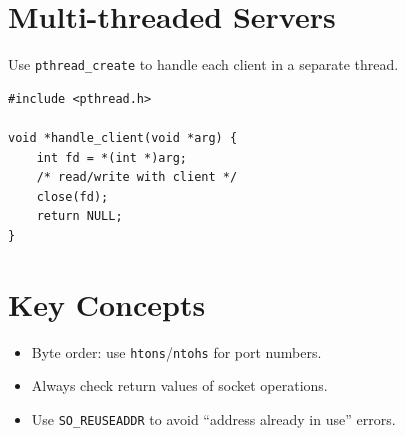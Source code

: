 \documentclass[11pt,a4paper]{article}
\begin{document}
\section{Multi-threaded Servers}
Use \texttt{pthread\_create} to handle each client in a separate thread.

\begin{lstlisting}
#include <pthread.h>

void *handle_client(void *arg) {
    int fd = *(int *)arg;
    /* read/write with client */
    close(fd);
    return NULL;
}
\end{lstlisting}

\section{Key Concepts}
\begin{itemize}
  \item Byte order: use \texttt{htons}/\texttt{ntohs} for port numbers.
  \item Always check return values of socket operations.
  \item Use \texttt{SO\_REUSEADDR} to avoid ``address already in use'' errors.
\end{itemize}
\end{document}
